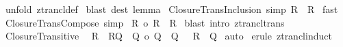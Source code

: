 \begin{isabellebody}
\isamarkupfalse%
\ {\isacharparenleft}unfold\ ztrancl{\isacharunderscore}def{\isacharparenright}\isanewline
{}\isamarkupfalse%
\ {\isacharparenleft}blast\ dest{\isacharbang}{\isacharcolon}\ lemma{}{\isacharparenright}\isanewline
{}\isamarkupfalse%
%
\endisatagproof
{\isafoldproof}%
%
\isadelimproof
\isanewline
%
\endisadelimproof
\isanewline
\isanewline
\isanewline
\isanewline
{}\isamarkupfalse%
\ Closure{\isacharunderscore}Trans{\isacharunderscore}Inclusion\ {\isacharbrackleft}simp{\isacharbrackright}{\isacharcolon}\ {\isachardoublequoteopen}R\ {\isacharless}{\isacharequal}\ {\isacharparenleft}R{\isacharpercent}{\isacharplus}{\isacharparenright}{\isachardoublequoteclose}\isanewline
%
\isadelimproof
%
\endisadelimproof
%
\isatagproof
{}\isamarkupfalse%
\ fast\isanewline
{}\isamarkupfalse%
%
\endisatagproof
{\isafoldproof}%
%
\isadelimproof
\isanewline
%
\endisadelimproof
\isanewline
{}\isamarkupfalse%
\ Closure{\isacharunderscore}Trans{\isacharunderscore}Compose\ {\isacharbrackleft}simp{\isacharbrackright}{\isacharcolon}\ \isanewline
{\isachardoublequoteopen}{\isacharparenleft}{\isacharparenleft}R{\isacharpercent}{\isacharplus}{\isacharparenright}\ {\isacharpercent}o\ {\isacharparenleft}R{\isacharpercent}{\isacharplus}{\isacharparenright}{\isacharparenright}\ {\isacharless}{\isacharequal}\ {\isacharparenleft}R{\isacharpercent}{\isacharplus}{\isacharparenright}{\isachardoublequoteclose}\isanewline
%
\isadelimproof
%
\endisadelimproof
%
\isatagproof
{}\isamarkupfalse%
\ {\isacharparenleft}blast\ intro{\isacharcolon}\ ztrancl{\isacharunderscore}trans{\isacharparenright}\isanewline
{}\isamarkupfalse%
%
\endisatagproof
{\isafoldproof}%
%
\isadelimproof
\isanewline
%
\endisadelimproof
\isanewline
{}\isamarkupfalse%
\ Closure{\isacharunderscore}Transitive\ {\isacharcolon}\ \isanewline
{\isachardoublequoteopen}{\isacharbang}{\isacharbang}R{\isachardot}\ {\isacharbrackleft}{\isacharbar}\ R{\isacharless}{\isacharequal}Q\ {\isacharampersand}\ Q\ {\isacharpercent}o\ Q\ {\isacharless}{\isacharequal}\ Q\ {\isacharbar}{\isacharbrackright}\ {\isacharequal}{\isacharequal}{\isachargreater}\ R{\isacharpercent}{\isacharplus}\ {\isacharless}{\isacharequal}\ Q{\isachardoublequoteclose}\isanewline
%
\isadelimproof
%
\endisadelimproof
%
\isatagproof
{}\isamarkupfalse%
\ auto\isanewline
{}\isamarkupfalse%
\ {\isacharparenleft}erule\ ztrancl{\isacharunderscore}induct{\isacharparenright}\isanewline

\end{isabellebody}
